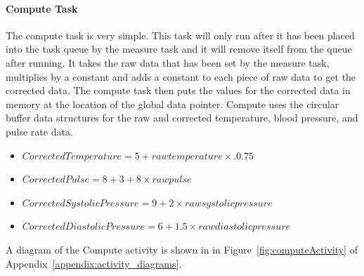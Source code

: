 \documentclass[12pt]{article} %
\begin{document}
    \paragraph{Compute Task} The compute task is very simple. This task will
    only run after it has been placed into the task queue by the measure task
    and it will remove itself from the queue after running. It takes the raw
    data that has been set by the measure task, multiplies by a constant and
    adds a constant to each piece of raw data to get the corrected data. The
    compute task then puts the values for the corrected data in memory at the
    location of the global data pointer. Compute uses the circular buffer data structures for the raw and corrected  temperature, blood pressure, and pulse rate data.
		
		\begin{itemize}
			\item $Corrected Temperature = 5 + raw temperature \times .0.75$
			\item $Corrected Pulse = 8 + 3 + 8 \times raw pulse$
			\item $Corrected Systolic Pressure = 9 + 2 \times raw systolic pressure$
			\item $Corrected Diastolic Pressure= 6 + 1.5 \times raw diastolic pressure$
		\end{itemize}

		A diagram of the Compute activity is shown in in
		Figure~\ref{fig:computeActivity} of Appendix~\ref{appendix:activity_diagrams}.
\end{document}
